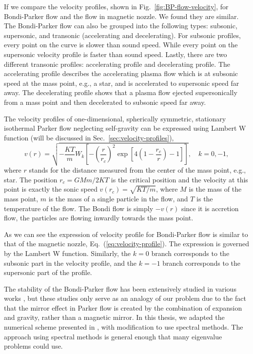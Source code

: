 If we compare the velocity profiles, shown in Fig.~\ref{fig:BP-flow-velocity}, for Bondi-Parker flow and the flow in magnetic nozzle. We found they are similar. The Bondi-Parker flow can also be grouped into the following types: subsonic, supersonic, and transonic (accelerating and decelerating). For subsonic profiles, every point on the curve is slower than sound speed. While every point on the supersonic velocity profile is faster than sound speed. Lastly, there are two different transonic profiles: accelerating profile and decelerating profile. The accelerating profile describes the accelerating plasma flow which is at subsonic speed at the mass point, e.g., a star, and is accelerated to supersonic speed far away. The decelerating profile shows that a plasma flow ejected supersonically from a mass point and then decelerated to subsonic speed far away.

The velocity profiles of one-dimensional, spherically symmetric, stationary isothermal Parker flow neglecting self-gravity can be expressed using Lambert W function (will be discussed in Sec.~\ref{sec:velocity-profiles}),
\begin{equation}
	v(r) = \sqrt{-\frac{KT}{m}W_k\left[ -\left(\frac{r}{r_c}\right)^2 \exp\left[4\left(1-\frac{r_c}{r}\right)-1\right] \right]}, \quad
	k = 0,-1,
\end{equation}
where $r$ stands for the distance measured from the center of the mass point, e.g., star. The position $r_c=GMm/2KT$ is the critical position and the velocity at this point is exactly the sonic speed $v(r_c)=\sqrt{KT/m}$, where $M$ is the mass of the mass point, $m$ is the mass of a single particle in the flow, and $T$ is the temperature of the flow. The Bondi flow is simply $-v(r)$ since it is accretion flow, the particles are flowing inwardly towards the mass point.

As we can see the expression of velocity profile for Bondi-Parker flow is similar to that of the magnetic nozzle, Eq.~(\ref{eq:velocity-profile}). The expression is governed by the Lambert W function. Similarly, the $k=0$ branch corresponds to the subsonic part in the velocity profile, and the $k=-1$ branch corresponds to the supersonic part of the profile.

The stability of the Bondi-Parker flow has been extensively studied in various works \cite{bondi_spherically_1952,velli_from_1994,velli_hydrodynamics_2001,del_dynamical_1998,keto_stability_2020,aikawa_stability_1979,stellingwerf_stability_1978}, but these studies only serve as an analogy of our problem due to the fact that the mirror effect in Parker flow is created by the combination of expansion and gravity, rather than a magnetic mirror. In this thesis, we adapted the numerical scheme presented in \cite{stellingwerf_stability_1978}, with modification to use spectral methods. The approach using spectral methods is general enough that many eigenvalue problems could use.


